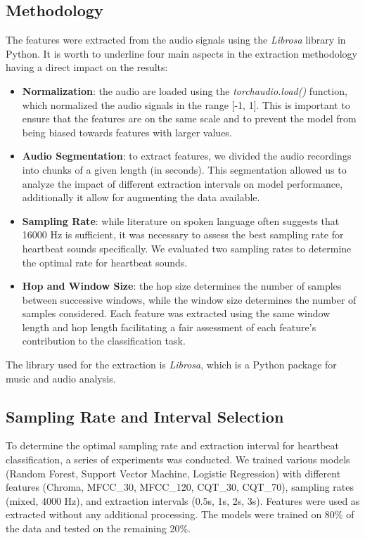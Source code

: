\subsection{Methodology}
The features were extracted from the audio signals using the \textit{Librosa} library in Python. It is worth to underline four main aspects in the extraction
methodology having a direct impact on the results:
\begin{itemize}[leftmargin=*]
    \item \textbf{Normalization}: the audio are loaded using the \textit{torchaudio.load()} function, which normalized the audio signals in the range [-1, 1]. This is important to ensure that the features are on the same scale and to prevent the model from being biased towards features with larger values.
    \item \textbf{Audio Segmentation}: to extract features, we divided the audio recordings into chunks of a given length (in seconds). This segmentation allowed us to analyze the impact of different extraction intervals on model performance, additionally it allow for augmenting the data available. 
    \item \textbf{Sampling Rate}: while literature on spoken language often suggests that 16000 Hz is sufficient, it was necessary to assess the best sampling rate for heartbeat sounds specifically. We evaluated two sampling rates to determine the optimal rate for heartbeat sounds. 
    \item \textbf{Hop and Window Size}: the hop size determines the number of samples between successive windows, while the window size determines the number of samples considered. Each feature was extracted using the same window length and hop length facilitating a fair assessment of each feature's contribution to the classification task. 
\end{itemize}
The library used for the extraction is \textit{Librosa}, which is a Python package for music and audio analysis. 

\subsection{Sampling Rate and Interval Selection}
To determine the optimal sampling rate and extraction interval for heartbeat classification, a series of experiments was conducted.
We trained various models (Random Forest, Support Vector Machine, Logistic Regression) with different features (Chroma, MFCC\_30, MFCC\_120, CQT\_30, CQT\_70),
sampling rates (mixed, 4000 Hz), and extraction intervals (0.5s, 1s, 2s, 3s). Features were used as extracted without any additional processing. 
The models were trained on 80\% of the data and tested on the remaining 20\%.

